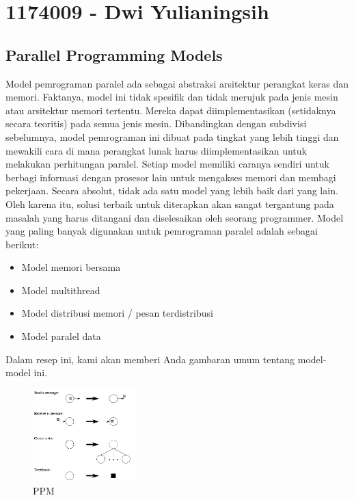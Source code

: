 \section{1174009 - Dwi Yulianingsih}
\subsection{Parallel Programming Models}
\hfill\break
Model pemrograman paralel ada sebagai abstraksi arsitektur perangkat keras dan memori. Faktanya, model ini tidak spesifik dan tidak merujuk pada jenis mesin atau arsitektur memori tertentu. Mereka dapat diimplementasikan (setidaknya secara teoritis) pada semua jenis mesin. Dibandingkan dengan subdivisi sebelumnya, model pemrograman ini dibuat pada tingkat yang lebih tinggi dan mewakili cara di mana perangkat lunak harus diimplementasikan untuk melakukan perhitungan paralel. Setiap model memiliki caranya sendiri untuk berbagi informasi dengan prosesor lain untuk mengakses memori dan membagi pekerjaan. Secara absolut, tidak ada satu model yang lebih baik dari yang lain. Oleh karena itu, solusi terbaik untuk diterapkan akan sangat tergantung pada masalah yang harus ditangani dan diselesaikan oleh seorang programmer. 
Model yang paling banyak digunakan untuk pemrograman paralel adalah sebagai berikut: 
\begin{itemize}
	\item Model memori bersama 
	\item Model multithread 
	\item Model distribusi memori / pesan terdistribusi
	\item Model paralel data 
\end{itemize}
Dalam resep ini, kami akan memberi Anda gambaran umum tentang model-model ini.
 \begin{figure}[H]
        \includegraphics[width=4cm]{figures/kelompok3/1/dwi1.PNG}
        \centering
        \caption{PPM}
\end{figure}
\hfill\break
